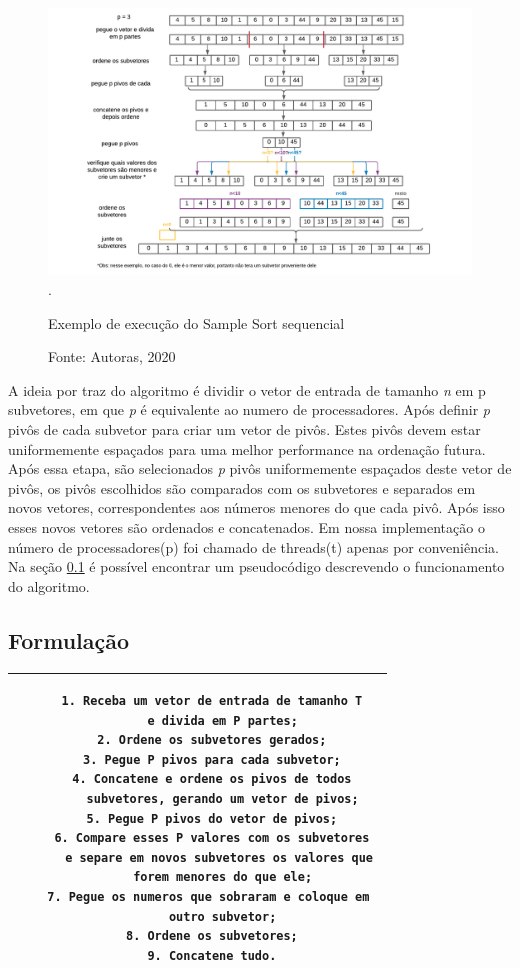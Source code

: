 \documentclass[journal]{IEEEtran}
\begin{document}
\begin{figure}[!htbp]
    \centering
    \centering
    \includegraphics[width=6in]{IEEEtran/imagens/samplesortsequencial}
    \DeclareGraphicsExtensions.
    \caption{Exemplo de execução do Sample Sort sequencial}
     \caption*{Fonte: Autoras, 2020}
    \label{fig:sequencial}
\end{figure}




A ideia por traz do algoritmo é dividir o vetor de entrada de tamanho \textit{n} em {p} subvetores, em que \textit{p} é equivalente ao numero de processadores. Após definir \textit{p} pivôs de cada subvetor para criar um vetor de pivôs. Estes pivôs devem estar uniformemente espaçados para uma melhor performance na ordenação futura. Após essa etapa, são selecionados \textit{p} pivôs uniformemente espaçados deste vetor de pivôs, os pivôs escolhidos são comparados com os subvetores e separados em novos vetores, correspondentes aos números menores do que cada pivô. Após isso esses novos vetores são ordenados e concatenados. Em nossa implementação o número de processadores(p) foi chamado de threads(t) apenas por conveniência. Na seção \ref{formulacao_seq} é possível encontrar um pseudocódigo descrevendo o funcionamento do algoritmo.

\subsection{Formulação}
\label{formulacao_seq}
\begin{table}[H]
    \centering
    \begin{tabular}{|c|}\hline
     \begin{lstlisting} 
    1. Receba um vetor de entrada de tamanho T
       e divida em P partes;
    2. Ordene os subvetores gerados;
    3. Pegue P pivos para cada subvetor;
    4. Concatene e ordene os pivos de todos
       subvetores, gerando um vetor de pivos;
    5. Pegue P pivos do vetor de pivos;
    6. Compare esses P valores com os subvetores
       e separe em novos subvetores os valores que 
       forem menores do que ele;
    7. Pegue os numeros que sobraram e coloque em 
       outro subvetor;
    8. Ordene os subvetores;
    9. Concatene tudo.
\end{lstlisting} \\
         \hline
    \end{tabular}
    \label{tab:pseudo_seq}
\end{table}
\end{document}
